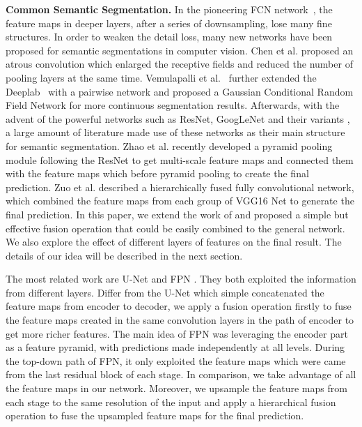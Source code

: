 \noindent\textbf{Common Semantic Segmentation.} 
In the pioneering FCN network~\cite{IEEEexample:Long_2015_CVPR}, the feature maps in deeper layers, after a series of downsampling, lose many fine structures.
In order to weaken the detail loss, many new networks have been proposed for semantic segmentations in computer vision.
% 
Chen et al.\cite{IEEEexample:chen2016deeplab} proposed an atrous  convolution which enlarged the receptive fields and reduced the number of pooling layers at the same time.
Vemulapalli et al.~\cite{IEEEexample:vemulapalli2016gaussian} further extended the Deeplab~\cite{IEEEexample:chen2016deeplab} with a pairwise network and proposed a Gaussian Conditional Random Field Network for more continuous segmentation results.
 Afterwards, with the advent of the powerful networks such as ResNet\cite{IEEEexample:he2016deep}, GoogLeNet\cite{IEEEexample:szegedy2015going} and their variants \cite{IEEEexample:szegedy2016rethinking}\cite{IEEEexample:szegedy2017inception}\cite{IEEEexample:xie2017aggregated}, a large amount of literature made use of these networks as their main structure for semantic segmentation.
 Zhao et al.\cite{IEEEexample:zhao2017contextually} recently developed a pyramid pooling module following the ResNet\cite{IEEEexample:he2016deep} to get multi-scale feature maps and connected them with the feature maps which before pyramid pooling to create the final prediction.
 Zuo et al.\cite{IEEEexample:zuo2016hf} described a hierarchically fused fully convolutional network, which combined the feature maps from each group of VGG16 Net to generate the final prediction.
 In this paper, we extend the work of\cite{IEEEexample:zuo2016hf} and proposed a simple but effective fusion operation that could be easily combined to the general network.
 We also explore the effect of different layers of features on the final result. The details of our idea will be described in the next section.


The most related work are U-Net\cite{IEEEexample:ronneberger2015u} and FPN \cite{IEEEexample:lin2017feature}. They both exploited the information from different layers. Differ from the U-Net which simple concatenated the feature maps from encoder to decoder, we apply a fusion operation firstly to fuse the feature maps created in the same convolution layers in the path of encoder to get more richer features.
The main idea of FPN was leveraging the encoder part as a feature pyramid, with predictions made independently at all levels. During the top-down path of FPN, it only exploited the feature maps which were came from the last residual block of each stage.
In comparison, we take advantage of all the feature maps in our network. Moreover, we upsample the feature maps from each stage to the same resolution of the input and apply a hierarchical fusion operation to fuse the upsampled feature maps for the final prediction.%








